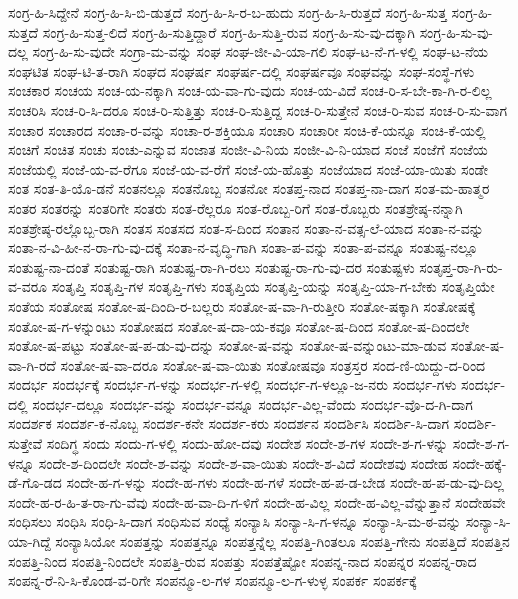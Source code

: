 {ಸಂಗ್ರ-ಹಿ-ಸಿದ್ದೇನೆ
ಸಂಗ್ರ-ಹಿ-ಸಿ-ಬಿ-ಡುತ್ತದೆ
ಸಂಗ್ರ-ಹಿ-ಸಿ-ರ-ಬ-ಹುದು
ಸಂಗ್ರ-ಹಿ-ಸಿ-ರುತ್ತದೆ
ಸಂಗ್ರ-ಹಿ-ಸುತ್ತ
ಸಂಗ್ರ-ಹಿ-ಸುತ್ತದೆ
ಸಂಗ್ರ-ಹಿ-ಸುತ್ತ-ಲಿದೆ
ಸಂಗ್ರ-ಹಿ-ಸುತ್ತಿದ್ದಾರೆ
ಸಂಗ್ರ-ಹಿ-ಸುತ್ತಿ-ರುವ
ಸಂಗ್ರ-ಹಿ-ಸು-ವು-ದಕ್ಕಾಗಿ
ಸಂಗ್ರ-ಹಿ-ಸು-ವು-ದಲ್ಲ
ಸಂಗ್ರ-ಹಿ-ಸು-ವುದೇ
ಸಂಗ್ರಾ-ಮ-ವನ್ನು
ಸಂಘ
ಸಂಘ-ಜೀ-ವಿ-ಯಾ-ಗಲಿ
ಸಂಘ-ಟ-ನೆ-ಗ-ಳಲ್ಲಿ
ಸಂಘ-ಟ-ನೆಯ
ಸಂಘಟಿತ
ಸಂಘ-ಟಿ-ತ-ರಾಗಿ
ಸಂಘದ
ಸಂಘರ್ಷ
ಸಂಘರ್ಷ-ದಲ್ಲಿ
ಸಂಘರ್ಷವೂ
ಸಂಘವನ್ನು
ಸಂಘ-ಸಂಸ್ಥೆ-ಗಳು
ಸಂಚಕಾರ
ಸಂಚಯ
ಸಂಚ-ಯ-ನಕ್ಕಾಗಿ
ಸಂಚ-ಯ-ವಾ-ಗು-ವುದು
ಸಂಚ-ಯ-ವಿದೆ
ಸಂಚ-ರಿ-ಸ-ಬೇ-ಕಾ-ಗಿ-ರ-ಲಿಲ್ಲ
ಸಂಚರಿಸಿ
ಸಂಚ-ರಿ-ಸಿ-ದರೂ
ಸಂಚ-ರಿ-ಸುತ್ತಿತ್ತು
ಸಂಚ-ರಿ-ಸುತ್ತಿದ್ದ
ಸಂಚ-ರಿ-ಸುತ್ತೇನೆ
ಸಂಚ-ರಿ-ಸುವ
ಸಂಚ-ರಿ-ಸು-ವಾಗ
ಸಂಚಾರ
ಸಂಚಾರದ
ಸಂಚಾ-ರ-ವನ್ನು
ಸಂಚಾ-ರ-ಶಕ್ತಿಯೂ
ಸಂಚಾರಿ
ಸಂಚಾರೀ
ಸಂಚಿ-ಕೆ-ಯನ್ನೂ
ಸಂಚಿ-ಕೆ-ಯಲ್ಲಿ
ಸಂಚಿಗೆ
ಸಂಚಿತ
ಸಂಚು
ಸಂಚು-ಎನ್ನುವ
ಸಂಜಾತ
ಸಂಜೀ-ವಿ-ನಿಯ
ಸಂಜೀ-ವಿ-ನಿ-ಯಾದ
ಸಂಜೆ
ಸಂಜೆಗೆ
ಸಂಜೆಯ
ಸಂಜೆಯಲ್ಲಿ
ಸಂಜೆ-ಯ-ವ-ರೆಗೂ
ಸಂಜೆ-ಯ-ವ-ರೆಗೆ
ಸಂಜೆ-ಯ-ಹೊತ್ತು
ಸಂಜೆಯಾದ
ಸಂಜೆ-ಯಾ-ಯಿತು
ಸಂಡೇ
ಸಂತ
ಸಂತ-ತಿ-ಯೊ-ಡನೆ
ಸಂತನಲ್ಲೂ
ಸಂತನೊಬ್ಬ
ಸಂತನೋ
ಸಂತಪ್ತ-ನಾದ
ಸಂತಪ್ತ-ನಾ-ದಾಗ
ಸಂತ-ಮ-ಹಾತ್ಮರ
ಸಂತರ
ಸಂತರನ್ನು
ಸಂತರಿಗೇ
ಸಂತರು
ಸಂತ-ರೆಲ್ಲರೂ
ಸಂತ-ರೊಬ್ಬ-ರಿಗೆ
ಸಂತ-ರೊಬ್ಬರು
ಸಂತಶ್ರೇಷ್ಠ-ನನ್ನಾಗಿ
ಸಂತಶ್ರೇಷ್ಠ-ರಲ್ಲೊಬ್ಬ-ರಾಗಿ
ಸಂತಸ
ಸಂತಸದ
ಸಂತ-ಸ-ದಿಂದ
ಸಂತಾನ
ಸಂತಾ-ನ-ವತ್ಸ-ಲೆ-ಯಾದ
ಸಂತಾ-ನ-ವನ್ನು
ಸಂತಾ-ನ-ವಿ-ಹೀ-ನ-ರಾ-ಗು-ವು-ದಕ್ಕೆ
ಸಂತಾ-ನ-ವೃದ್ಧಿ-ಗಾಗಿ
ಸಂತಾ-ಪ-ವನ್ನು
ಸಂತಾ-ಪ-ವನ್ನೂ
ಸಂತುಷ್ಟ-ನಲ್ಲೂ
ಸಂತುಷ್ಟ-ನಾ-ದಂತೆ
ಸಂತುಷ್ಟ-ರಾಗಿ
ಸಂತುಷ್ಟ-ರಾ-ಗಿ-ರಲು
ಸಂತುಷ್ಟ-ರಾ-ಗು-ವು-ದರ
ಸಂತುಷ್ಟಳು
ಸಂತೃಪ್ತ-ರಾ-ಗಿ-ರು-ವ-ವರೂ
ಸಂತೃಪ್ತಿ
ಸಂತೃಪ್ತಿ-ಗಳ
ಸಂತೃಪ್ತಿ-ಗಳು
ಸಂತೃಪ್ತಿಯ
ಸಂತೃಪ್ತಿ-ಯನ್ನು
ಸಂತೃಪ್ತಿ-ಯಾ-ಗ-ಬೇಕು
ಸಂತೃಪ್ತಿಯೇ
ಸಂತೆಯ
ಸಂತೋಷ
ಸಂತೋ-ಷ-ದಿಂದಿ-ರ-ಬಲ್ಲರು
ಸಂತೋ-ಷ-ವಾ-ಗಿ-ರುತ್ತೀರಿ
ಸಂತೋ-ಷಕ್ಕಾಗಿ
ಸಂತೋಷಕ್ಕೆ
ಸಂತೋ-ಷ-ಗ-ಳನ್ನುಂಟು
ಸಂತೋಷದ
ಸಂತೋ-ಷ-ದಾ-ಯ-ಕವೂ
ಸಂತೋ-ಷ-ದಿಂದ
ಸಂತೋ-ಷ-ದಿಂದಲೇ
ಸಂತೋ-ಷ-ಪಟ್ಟು
ಸಂತೋ-ಷ-ಪ-ಡು-ವು-ದನ್ನು
ಸಂತೋ-ಷ-ವನ್ನು
ಸಂತೋ-ಷ-ವನ್ನುಂಟು-ಮಾ-ಡುವ
ಸಂತೋ-ಷ-ವಾ-ಗಿ-ರದೆ
ಸಂತೋ-ಷ-ವಾ-ದರೂ
ಸಂತೋ-ಷ-ವಾ-ಯಿತು
ಸಂತೋಷವೂ
ಸಂತ್ರಸ್ತರ
ಸಂದ-ಣಿ-ಯಿದ್ದು-ದ-ರಿಂದ
ಸಂದರ್ಭ
ಸಂದರ್ಭಕ್ಕೆ
ಸಂದರ್ಭ-ಗ-ಳನ್ನು
ಸಂದರ್ಭ-ಗ-ಳಲ್ಲಿ
ಸಂದರ್ಭ-ಗ-ಳಲ್ಲೂ-ಜ-ನರು
ಸಂದರ್ಭ-ಗಳು
ಸಂದರ್ಭ-ದಲ್ಲಿ
ಸಂದರ್ಭ-ದಲ್ಲೂ
ಸಂದರ್ಭ-ವನ್ನು
ಸಂದರ್ಭ-ವನ್ನೂ
ಸಂದರ್ಭ-ವಿಲ್ಲ-ವೆಂದು
ಸಂದರ್ಭ-ವೊ-ದ-ಗಿ-ದಾಗ
ಸಂದರ್ಶಕ
ಸಂದರ್ಶ-ಕ-ನೊಬ್ಬ
ಸಂದರ್ಶ-ಕನೇ
ಸಂದರ್ಶ-ಕರು
ಸಂದರ್ಶನ
ಸಂದರ್ಶಿಸಿ
ಸಂದರ್ಶಿ-ಸಿ-ದಾಗ
ಸಂದರ್ಶಿ-ಸುತ್ತೇವೆ
ಸಂದಿಗ್ಧ
ಸಂದು
ಸಂದು-ಗ-ಳಲ್ಲಿ
ಸಂದು-ಹೋ-ದವು
ಸಂದೇಶ
ಸಂದೇ-ಶ-ಗಳ
ಸಂದೇ-ಶ-ಗ-ಳನ್ನು
ಸಂದೇ-ಶ-ಗ-ಳನ್ನೂ
ಸಂದೇ-ಶ-ದಿಂದಲೇ
ಸಂದೇ-ಶ-ವನ್ನು
ಸಂದೇ-ಶ-ವಾ-ಯಿತು
ಸಂದೇ-ಶ-ವಿದೆ
ಸಂದೇಶವು
ಸಂದೇಹ
ಸಂದೇ-ಹಕ್ಕೆ-ಡೆ-ಗೊ-ಡದ
ಸಂದೇ-ಹ-ಗ-ಳನ್ನು
ಸಂದೇ-ಹ-ಗಳು
ಸಂದೇ-ಹ-ಗಳೆ
ಸಂದೇ-ಹ-ಪ-ಡ-ಬೇಡ
ಸಂದೇ-ಹ-ಪ-ಡು-ವು-ದಿಲ್ಲ
ಸಂದೇ-ಹ-ರ-ಹಿ-ತ-ರಾ-ಗು-ವೆವು
ಸಂದೇ-ಹ-ವಾ-ದಿ-ಗ-ಳಿಗೆ
ಸಂದೇ-ಹ-ವಿಲ್ಲ
ಸಂದೇ-ಹ-ವಿಲ್ಲ-ವೆನ್ನುತ್ತಾನೆ
ಸಂದೇಹವೇ
ಸಂಧಿಸಲು
ಸಂಧಿಸಿ
ಸಂಧಿ-ಸಿ-ದಾಗ
ಸಂಧಿಸುವ
ಸಂಧ್ಯೆ
ಸಂನ್ಯಾಸಿ
ಸಂನ್ಯಾ-ಸಿ-ಗ-ಳನ್ನೂ
ಸಂನ್ಯಾ-ಸಿ-ಮ-ಠ-ವನ್ನು
ಸಂನ್ಯಾ-ಸಿ-ಯಾ-ಗಿದ್ದೆ
ಸಂನ್ಯಾಸಿಯೋ
ಸಂಪತ್ತನ್ನು
ಸಂಪತ್ತನ್ನೂ
ಸಂಪತ್ತನ್ನೆಲ್ಲ
ಸಂಪತ್ತಿ-ಗಿಂತಲೂ
ಸಂಪತ್ತಿ-ಗೇನು
ಸಂಪತ್ತಿದೆ
ಸಂಪತ್ತಿನ
ಸಂಪತ್ತಿ-ನಿಂದ
ಸಂಪತ್ತಿ-ನಿಂದಲೇ
ಸಂಪತ್ತಿ-ರುವ
ಸಂಪತ್ತು
ಸಂಪತ್ತೆಷ್ಟೋ
ಸಂಪನ್ನ-ನಾದ
ಸಂಪನ್ನರ
ಸಂಪನ್ನ-ರಾದ
ಸಂಪನ್ನ-ರೆ-ನಿ-ಸಿ-ಕೊಂಡ-ವ-ರಿಗೇ
ಸಂಪನ್ಮೂ-ಲ-ಗಳ
ಸಂಪನ್ಮೂ-ಲ-ಗ-ಳುಳ್ಳ
ಸಂಪರ್ಕ
ಸಂಪರ್ಕಕ್ಕೆ
}
